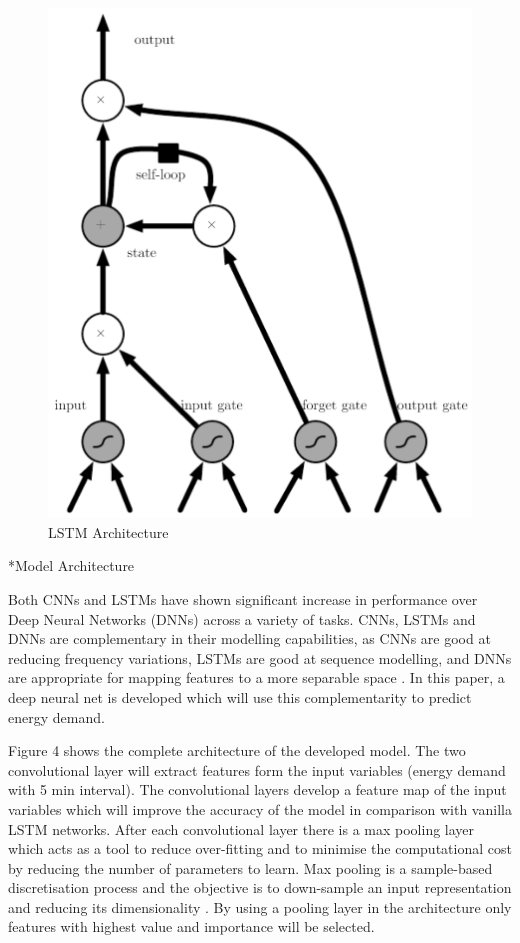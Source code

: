 \documentclass[twocolumn, a4paper,10pt]{article}
\makeatletter
\renewcommand\subsubsection{\@startsection{subsection}{1}{\z@}{0.2cm}{0.1cm}{\normalfont\normalsize\itshape}}
\makeatother
\begin{document}
\begin{figure}[ht]
    \centering
    \includegraphics[scale=0.2]{img/lstm.jpg}
    \caption{LSTM Architecture \citep{RN1282}}
    \label{fig:lstm}
\end{figure}

\subsubsection*{Model Architecture}

Both CNNs and LSTMs have shown significant increase in performance over Deep Neural Networks (DNNs) across a variety of tasks. CNNs, LSTMs and DNNs are complementary in their modelling capabilities, as CNNs are good at reducing frequency variations, LSTMs are good at sequence modelling, and DNNs are appropriate
for mapping features to a more separable space \citep{RN1274}. In this paper, a deep neural net is developed which will use this complementarity to predict energy demand.

Figure 4 shows the complete architecture of the developed model. The two convolutional layer will extract features form the input variables (energy demand with 5 min interval). The convolutional layers develop a feature map of the input variables which will improve the accuracy of the model in comparison with vanilla LSTM networks. After each convolutional layer there is a max pooling layer which acts as a tool to reduce over-fitting and to minimise the computational cost by reducing the number of parameters to learn. Max pooling is a sample-based discretisation process and the objective is to down-sample an input representation and reducing its dimensionality \citep{RN1291}. By using a pooling layer in the architecture only features with highest value and importance will be selected. 
\end{document}
